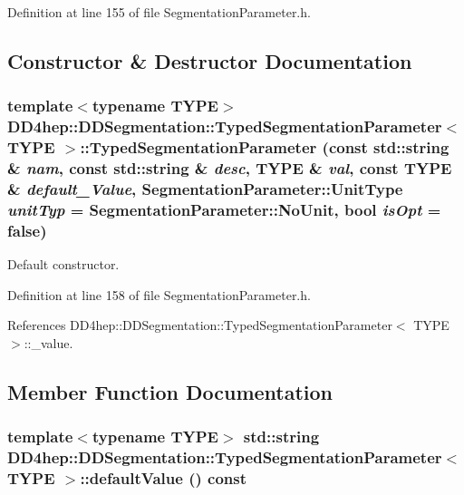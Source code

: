 Definition at line 155 of file SegmentationParameter.h.

\subsection{Constructor \& Destructor Documentation}
\hypertarget{class_d_d4hep_1_1_d_d_segmentation_1_1_typed_segmentation_parameter_a59c2507c03ce750d64a5800bdc0f531b}{
\subsubsection[{TypedSegmentationParameter}]{\setlength{\rightskip}{0pt plus 5cm}template$<$typename TYPE$>$ {\bf DD4hep::DDSegmentation::TypedSegmentationParameter}$<$ TYPE $>$::{\bf TypedSegmentationParameter} (const std::string \& {\em nam}, \/  const std::string \& {\em desc}, \/  TYPE \& {\em val}, \/  const TYPE \& {\em default\_\-Value}, \/  {\bf SegmentationParameter::UnitType} {\em unitTyp} = {\ttfamily SegmentationParameter::NoUnit}, \/  bool {\em isOpt} = {\ttfamily false})}}
\label{class_d_d4hep_1_1_d_d_segmentation_1_1_typed_segmentation_parameter_a59c2507c03ce750d64a5800bdc0f531b}


Default constructor. 

Definition at line 158 of file SegmentationParameter.h.

References DD4hep::DDSegmentation::TypedSegmentationParameter$<$ TYPE $>$::\_\-value.

\subsection{Member Function Documentation}
\hypertarget{class_d_d4hep_1_1_d_d_segmentation_1_1_typed_segmentation_parameter_ad3c9449bad6d6516505d1677e548f251}{
\subsubsection[{defaultValue}]{\setlength{\rightskip}{0pt plus 5cm}template$<$typename TYPE$>$ std::string {\bf DD4hep::DDSegmentation::TypedSegmentationParameter}$<$ TYPE $>$::defaultValue () const}}
\label{class_d_d4hep_1_1_d_d_segmentation_1_1_typed_segmentation_parameter_ad3c9449bad6d6516505d1677e548f251}


